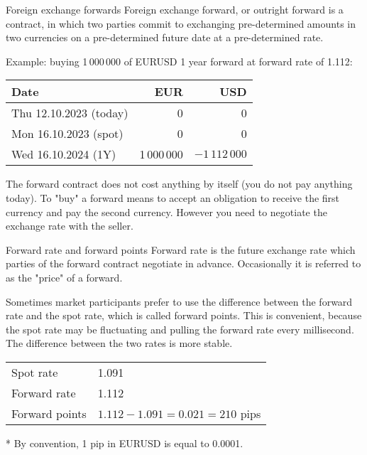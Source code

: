 \documentclass{beamer}
\begin{document}
\begin{frame}{Foreign exchange forwards}
\justify
\alert{Foreign exchange forward, or outright forward} is a contract, in which two parties commit to exchanging pre-determined amounts in two currencies on a pre-determined future date at a pre-determined rate. 

\justify
Example: buying 1\,000\,000 of EURUSD 1 year forward at forward rate of 1.112:

\centering
\begin{tabular}{l|r|r}
Date                          & EUR & USD \\ \hline
Thu 12.10.2023 (today)  & 0   & 0   \\
Mon 16.10.2023 (spot) & 0   & 0   \\
Wed 16.10.2024 (1Y)   & 1\,000\,000 & $-1\,112\,000$
\end{tabular}

\justify
The forward contract does not cost anything by itself (you do not pay anything today). To "buy" a forward means to accept an obligation to receive the first currency and pay the second currency. However you need to negotiate the exchange rate with the seller.
\end{frame}



\begin{frame}{Forward rate and forward points}
\justify
\alert{Forward rate} is the future exchange rate which parties of the forward contract negotiate in advance. Occasionally it is
referred to as the "price" of a forward.

\justify
Sometimes market participants prefer to use the difference between the forward rate and the spot rate, which is called \alert{forward points}. This is convenient, because the spot rate may be fluctuating and pulling the forward rate every millisecond. The difference between the two rates is more stable.

\vspace{\baselineskip}
\centering
\begin{tabular}{l|l}
Spot rate & 1.091 \\
Forward rate & 1.112 \\
\hline
Forward points & $1.112 - 1.091 = 0.021 = 210$ pips
\end{tabular}

\justify
* By convention, 1 pip in EURUSD is equal to 0.0001.
\end{frame}
\end{document}
